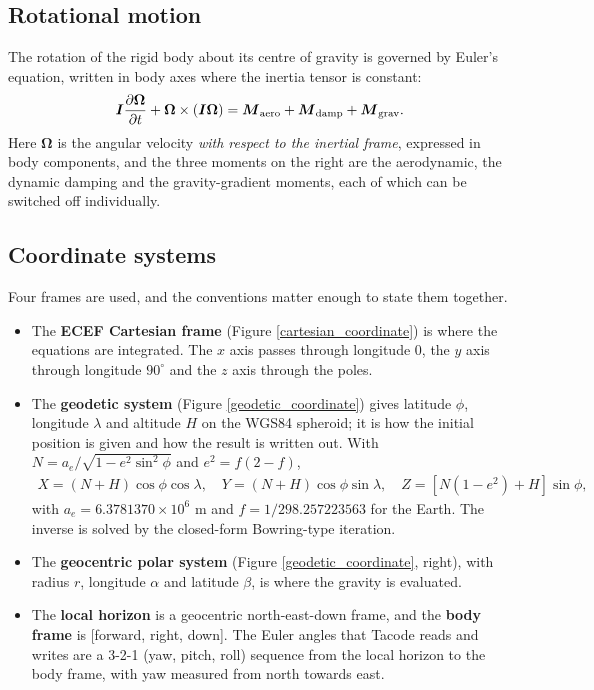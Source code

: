 \documentclass[11pt,a4paper]{article}
\newcommand{\bM}{{\boldsymbol M}}
\newcommand{\bI}{{\boldsymbol I}}
\newcommand{\bOm}{{\boldsymbol \Omega}}
\begin{document}
\subsection{Rotational motion}

The rotation of the rigid body about its centre of gravity is governed by Euler's
equation, written in body axes where the inertia tensor is constant:
%
\begin{align}
	\bI \frac{ \partial \bOm }{ \partial t }
	+ \bOm \times \left( \bI \bOm \right)
	= \bM_{\rm aero} + \bM_{\rm damp} + \bM_{\rm grav} .
	\label{law_euler}
\end{align}
%
Here $\bOm$ is the angular velocity \emph{with respect to the inertial frame}, expressed
in body components, and the three moments on the right are the aerodynamic, the dynamic
damping and the gravity-gradient moments, each of which can be switched off individually.

\subsection{Coordinate systems}

Four frames are used, and the conventions matter enough to state them together.

\begin{itemize}
\item The \textbf{ECEF Cartesian frame} (Figure \ref{cartesian_coordinate}) is where the
equations are integrated. The $x$ axis passes through longitude $0$, the $y$ axis through
longitude $90^\circ$ and the $z$ axis through the poles.
\item The \textbf{geodetic system} (Figure \ref{geodetic_coordinate}) gives latitude
$\phi$, longitude $\lambda$ and altitude $H$ on the WGS84 spheroid; it is how the initial
position is given and how the result is written out. With
$N = a_e / \sqrt{1 - e^2 \sin^2\phi}$ and $e^2 = f(2-f)$,
\begin{align}
	X = (N+H) \cos\phi \cos\lambda , \quad
	Y = (N+H) \cos\phi \sin\lambda , \quad
	Z = \left[ N(1-e^2) + H \right] \sin\phi ,
\end{align}
with $a_e = 6.3781370 \times 10^6$ m and $f = 1/298.257223563$ for the Earth. The inverse
is solved by the closed-form Bowring-type iteration.
\item The \textbf{geocentric polar system} (Figure \ref{geodetic_coordinate}, right),
with radius $r$, longitude $\alpha$ and latitude $\beta$, is where the gravity is
evaluated.
\item The \textbf{local horizon} is a geocentric north-east-down frame, and the
\textbf{body frame} is [forward, right, down]. The Euler angles that Tacode reads and
writes are a 3-2-1 (yaw, pitch, roll) sequence from the local horizon to the body frame,
with yaw measured from north towards east.
\end{itemize}
\end{document}
